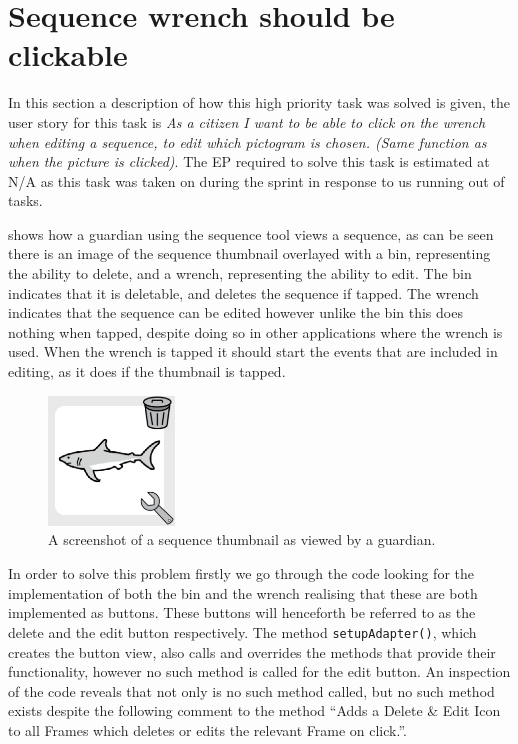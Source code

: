 \section{Sequence wrench should be clickable}
In this section a description of how this high priority task was solved is given, the user story for this task is \textit{As a citizen I want to be able to click on the wrench when editing a sequence, to edit which pictogram is chosen. (Same function as when the picture is clicked)}.
The EP required to solve this task is estimated at N/A as this task was taken on during the sprint in response to us running out of tasks.

 shows how a guardian using the sequence tool views a sequence, as can be seen there is an image of the sequence thumbnail overlayed with a bin, representing the ability to delete, and a wrench, representing the ability to edit.
The bin indicates that it is deletable, and deletes the sequence if tapped.
The wrench indicates that the sequence can be edited however unlike the bin this does nothing when tapped, despite doing so in other applications where the wrench is used.
When the wrench is tapped it should start the events that are included in editing, as it does if the thumbnail is tapped.
\begin{figure}
    \centering
    \includegraphics[width=0.3\textwidth]{figures/img/screenshots/sequence_pictogram.png} 
    \caption{A screenshot of a sequence thumbnail as viewed by a guardian.}
    \label{fig:seq_wrench} 
    \vspace{10pt}
\end{figure}
\bigskip
\noindent
In order to solve this problem firstly we go through the code looking for the implementation of both the bin and the wrench realising that these are both implemented as buttons.
These buttons will henceforth be referred to as the delete and the edit button respectively.
The method \texttt{setupAdapter()}, which creates the button view, also calls and overrides the methods that provide their functionality, however no such method is called for the edit button.
An inspection of the code reveals that not only is no such method called, but no such method exists despite the following comment to the method ``\/\/Adds a Delete \& Edit Icon to all Frames which deletes or edits the relevant Frame on click.''.

